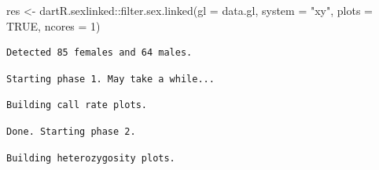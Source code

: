 \documentclass[
  letterpaper,
  DIV=11,
  numbers=noendperiod]{scrreprt}
\newenvironment{Shaded}{\begin{snugshade}}{\end{snugshade}}
\newcommand{\AttributeTok}[1]{\textcolor[rgb]{0.49,0.56,0.16}{#1}}
\newcommand{\ConstantTok}[1]{\textcolor[rgb]{0.53,0.00,0.00}{#1}}
\newcommand{\DecValTok}[1]{\textcolor[rgb]{0.25,0.63,0.44}{#1}}
\newcommand{\FunctionTok}[1]{\textcolor[rgb]{0.02,0.16,0.49}{#1}}
\newcommand{\NormalTok}[1]{\textcolor[rgb]{0.00,0.44,0.13}{#1}}
\newcommand{\OtherTok}[1]{\textcolor[rgb]{0.00,0.44,0.13}{#1}}
\newcommand{\SpecialCharTok}[1]{\textcolor[rgb]{0.25,0.44,0.63}{#1}}
\newcommand{\StringTok}[1]{\textcolor[rgb]{0.25,0.44,0.63}{#1}}
\let\textttOrig\texttt
\renewcommand{\texttt}[1]{\textttOrig{\color{blue}{#1}}}
\begin{document}
\begin{Shaded}
\begin{Highlighting}[]
\NormalTok{res }\OtherTok{\textless{}{-}}\NormalTok{ dartR.sexlinked}\SpecialCharTok{::}\FunctionTok{filter.sex.linked}\NormalTok{(}\AttributeTok{gl =}\NormalTok{ data.gl, }\AttributeTok{system =} \StringTok{"xy"}\NormalTok{, }\AttributeTok{plots =} \ConstantTok{TRUE}\NormalTok{,}
    \AttributeTok{ncores =} \DecValTok{1}\NormalTok{)}
\end{Highlighting}
\end{Shaded}

\begin{verbatim}
Detected 85 females and 64 males.
\end{verbatim}

\begin{verbatim}
Starting phase 1. May take a while...
\end{verbatim}

\begin{verbatim}
Building call rate plots.
\end{verbatim}

\begin{figure}[H]

{\centering \texttt{[image: Session10\_SexLinkedMarkers\_files/figure-pdf/unnamed-chunk-19-1.pdf]}

}

\end{figure}

\begin{verbatim}
Done. Starting phase 2.
\end{verbatim}

\begin{verbatim}
Building heterozygosity plots.
\end{verbatim}

\begin{figure}[H]

{\centering \texttt{[image: Session10\_SexLinkedMarkers\_files/figure-pdf/unnamed-chunk-19-2.pdf]}

}

\end{figure}

\begin{figure}[H]

{\centering \texttt{[image: Session10\_SexLinkedMarkers\_files/figure-pdf/unnamed-chunk-19-3.pdf]}

}

\end{figure}
\end{document}
